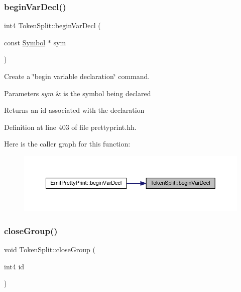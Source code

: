 \subsubsection{\texorpdfstring{beginVarDecl()}{beginVarDecl()}}
{\footnotesize\ttfamily int4 Token\+Split\+::begin\+Var\+Decl (\begin{DoxyParamCaption}\item[{const \mbox{\hyperlink{class_symbol}{Symbol}} $\ast$}]{sym }\end{DoxyParamCaption})\hspace{0.3cm}{\ttfamily [inline]}}



Create a \char`\"{}begin variable declaration\char`\"{} command. 


\begin{DoxyParams}{Parameters}
{\em sym} & is the symbol being declared \\
\hline
\end{DoxyParams}
\begin{DoxyReturn}{Returns}
an id associated with the declaration 
\end{DoxyReturn}


Definition at line 403 of file prettyprint.\+hh.

Here is the caller graph for this function\+:
\nopagebreak
\begin{figure}[H]
\begin{center}
\leavevmode
\includegraphics[width=350pt]{class_token_split_a45ce997b26f444d7ddb42e57693f2907_icgraph}
\end{center}
\end{figure}
\mbox{\label{class_token_split_af01c0522ada54a8d777e6b9a1b840794}} 
\subsubsection{\texorpdfstring{closeGroup()}{closeGroup()}}
{\footnotesize\ttfamily void Token\+Split\+::close\+Group (\begin{DoxyParamCaption}\item[{int4}]{id }\end{DoxyParamCaption})\hspace{0.3cm}{\ttfamily [inline]}}



